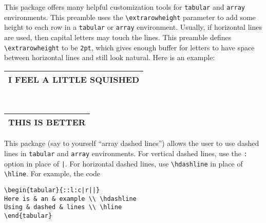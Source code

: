 \documentclass[letterpaper,12pt]{article}
\begin{document}
\begin{description}[align=margin,labelsep=0pt,leftmargin=0pt,style=multiline,labelwidth=63pt]
{}
\item[\href{http://mirrors.concertpass.com/tex-archive/macros/latex/required/tools/array.pdf}{\texttt{array}}] This package offers many helpful customization tools for \texttt{tabular} and \texttt{array} environments. This preamble uses the \verb|\extrarowheight| parameter to add some height to each row in a \texttt{tabular} or \texttt{array} environment. Usually, if horizontal lines are used, then capital letters may touch the lines. This preamble defines \verb|\extrarowheight| to be \texttt{2pt}, which gives enough buffer for letters to have space between horizontal lines and still look natural. Here is an example:

\Needspace*{1in}
\begin{shaded*}
\begin{center}
\setlength{\extrarowheight}{0pt}
\begin{tabular}{|c|}
\hline
I FEEL A LITTLE SQUISHED \\ \hline
\end{tabular} \\[1em]
\setlength{\extrarowheight}{2pt}
\begin{tabular}{|c|}
\hline
THIS IS BETTER \\ \hline
\end{tabular}
\end{center}
\end{shaded*}


{}
\item[\href{http://ctan.math.washington.edu/tex-archive/macros/latex/contrib/arydshln/arydshln-man.pdf}{\texttt{arydshln}}] This package (say to yourself ``array dashed lines'') allows the user to use dashed lines in \texttt{tabular} and \texttt{array} environments. For vertical dashed lines, use the \texttt{:} option in place of \texttt{|}. For horizontal dashed lines, use \verb|\hdashline| in place of \verb|\hline|. For example, the code

\begin{Verbatim}[frame=single,gobble=0,fontsize=\small]
\begin{tabular}{::l:c|r||}
Here is & an & example \\ \hdashline
Using & dashed & lines \\ \hline
\end{tabular}
\end{Verbatim}


\end{description}
\end{document}

